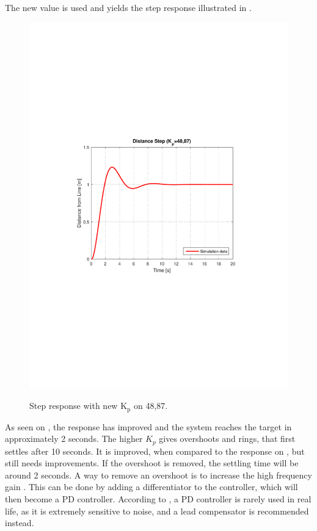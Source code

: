 The new value is used and yields the step response illustrated in .

\begin{figure}[H]
  \centering
  {
    \includegraphics[width=1.4\textwidth]{figures/distanceStep2.pdf}
  }
  \caption{Step response with new $\text{K}_\text{p}$ on 48,87.}
  \label{SimulationSteeringP2}
\end{figure}
As seen on , the response has improved and the system reaches the target in approximately 2 seconds. The higher $K_p$ gives overshoots and rings, that first settles after 10 seconds. It is improved, when compared to the response on , but still needs improvements. If the overshoot is removed, the settling time will be around 2 seconds. A way to remove an overshoot is to increase the high frequency gain \cite{KMNielsen}. This can be done by adding a differentiator to the controller, which will then become a PD controller. According to \cite{Franklin}, a PD controller is rarely used in real life, as it is extremely sensitive to noise, and a lead compensator is recommended instead.

